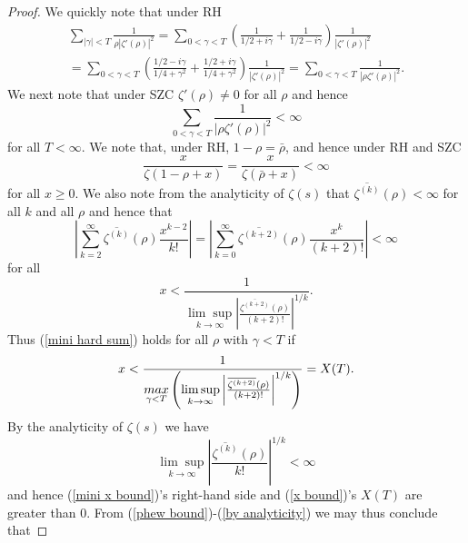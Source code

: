 \documentclass[10pt,a4paper]{amsart}
\begin{document}
\begin{proof}
We quickly note that under RH
\begin{align}
\sum_{\left|\gamma\right|<T}\frac{1}{\rho\left|\zeta'(\rho)\right|^{2}}=\sum_{0<\gamma<T}\left(\frac{1}{1/2+i\gamma}+\frac{1}{1/2-i\gamma}\right)\frac{1}{\left|\zeta'(\rho)\right|^{2}} \nonumber \\ =\sum_{0<\gamma<T}\left(\frac{1/2-i\gamma}{1/4+\gamma^{2}}+\frac{1/2+i\gamma}{1/4+\gamma^{2}}\right)\frac{1}{\left|\zeta'(\rho)\right|^{2}}=\sum_{0<\gamma<T}\frac{1}{\left|\rho \zeta'(\rho)\right|^{2}}.
\label{write it out}
\end{align}
We next note that under SZC $\zeta'(\rho)\neq 0$ for all $\rho$ and hence
\begin{equation}
\sum_{0<\gamma<T}\frac{1}{\left|\rho \zeta'(\rho)\right|^{2}}<\infty \label{easy sum}
\end{equation}
for all $T<\infty$. We note that, under RH, $1-\rho=\bar{\rho}$, and hence under RH and SZC
\begin{equation}
\frac{x}{\zeta(1-\rho+x)}=\frac{x}{\zeta\left(\bar{\rho}+x\right)}<\infty \label{phew bound}
\end{equation}
for all $x\geq 0$. We also note from the analyticity of $\zeta(s)$ that $\overline{\zeta^{(k)}}(\rho)<\infty$ for all $k$ and all $\rho$ and hence that
\begin{equation}
\left|\sum_{k=2}^{\infty}\overline{\zeta^{(k)}}(\rho)\frac{x^{k-2}}{k!}\right|=\left|\sum_{k=0}^{\infty}\overline{\zeta^{(k+2)}}(\rho)\frac{x^{k}}{(k+2)!}\right|<\infty \label{mini hard sum}
\end{equation}
for all 
\begin{equation}
x<\frac{1}{\underset{k\rightarrow \infty}{\lim\sup}\left|\frac{\overline{\zeta^{(k+2)}}(\rho)}{(k+2)!}\right|^{1/k}}. \label{mini x bound}
\end{equation}
Thus (\ref{mini hard sum}) holds for all $\rho$ with $\gamma<T$ if 
\begin{equation}
x<\frac{1}{\underset{\gamma<T}{\textnormal{max}}\left(\underset{k\rightarrow \infty}{\lim\sup}\left|\frac{\overline{\zeta^{(k+2)}}(\rho)}{(k+2)!}\right|^{1/k}\right)}=X(T).
\end{equation}
By the analyticity of $\zeta(s)$ we have
\begin{equation}
\underset{k\rightarrow \infty}{\lim \sup}\left|\frac{\overline{\zeta^{(k)}}(\rho)}{k!}\right|^{1/k}<\infty \label{by analyticity}
\end{equation}
and hence (\ref{mini x bound})'s right-hand side and (\ref{x bound})'s $X(T)$ are greater than $0$. From (\ref{phew bound})-(\ref{by analyticity}) we may thus conclude that 

\end{proof}
\end{document}
